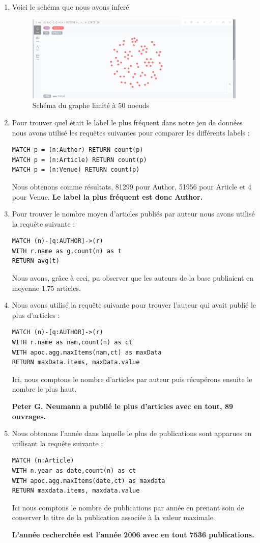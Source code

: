 \documentclass[11pt]{article}
\begin{document}
\begin{enumerate}
\item  
Voici le schéma que nous avons inferé
\begin{figure}[H]
  \centerline{\includegraphics[scale=0.45]{schema_complet_rep.png}}
  \caption{Schéma du graphe limité à 50 noeuds}
\end{figure}
\item 
Pour trouver quel était le label le plus fréquent dans notre jeu
de données nous avons utilisé les requêtes suivantes pour comparer les différents labels :
\begin{lstlisting}
MATCH p = (n:Author) RETURN count(p)
MATCH p = (n:Article) RETURN count(p) 
MATCH p = (n:Venue) RETURN count(p)
\end{lstlisting}

Nous obtenons comme résultats, 81299 pour Author, 51956 pour Article et 4 pour Venue.
\textbf{Le label la plus fréquent est donc Author.}
\item 
Pour trouver le nombre moyen d'articles publiés par auteur nous avons utilisé la requête suivante :
\begin{lstlisting}
MATCH (n)-[q:AUTHOR]->(r) 
WITH r.name as g,count(n) as t 
RETURN avg(t)
\end{lstlisting}

Nous avons, grâce à ceci, pu observer que les auteurs de la base publiaient en moyenne 1.75 articles.
\item 
Nous avons utilisé la requête suivante pour trouver l'auteur qui avait publié le plus d'articles : 
\begin{lstlisting}
MATCH (n)-[q:AUTHOR]->(r) 
WITH r.name as nam,count(n) as ct 
WITH apoc.agg.maxItems(nam,ct) as maxData 
RETURN maxData.items, maxData.value
\end{lstlisting}
Ici, nous comptons le nombre d'articles par auteur puis récupérons ensuite le nombre le plus haut.

\textbf{Peter G. Neumann a publié le plus d'articles avec en tout, 89 ouvrages.}
\item 
Nous obtenons l'année dans laquelle le plus de publications sont apparues en utilisant la requête suivante :
\begin{lstlisting}
MATCH (n:Article) 
WITH n.year as date,count(n) as ct 
WITH apoc.agg.maxItems(date,ct) as maxdata 
RETURN maxdata.items, maxdata.value
\end{lstlisting}
Ici nous comptons le nombre de publications par année en prenant soin de conserver le titre de la publication associée à la valeur maximale.

\textbf{L'année recherchée est l'année 2006 avec en tout 7536 publications.}
\end{enumerate}
\end{document}
